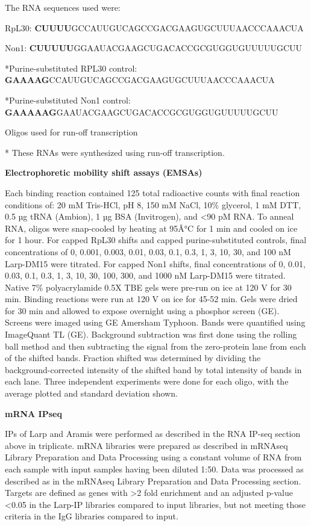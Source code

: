 \documentclass[12pt,oneside]{reedthesis}
\begin{document}
The RNA sequences used were:

RpL30: \textbf{CUUUU}GCCAUUGUCAGCCGACGAAGUGCUUUAACCCAAACUA

Non1: \textbf{CUUUUU}GGAAUACGAAGCUGACACCGCGUGGUGUUUUUGCUU

*Purine-substituted RPL30 control: \textbf{GAAAAG}CCAUUGUCAGCCGACGAAGUGCUUUAACCCAAACUA

*Purine-substituted Non1 control: \textbf{GAAAAAG}GAAUACGAAGCUGACACCGCGUGGUGUUUUUGCUU

Oligos used for run-off transcription

* These RNAs were synthesized using run-off transcription.

\textbf{Electrophoretic mobility shift assays (EMSAs)}

Each binding reaction contained 125 total radioactive counts with final reaction conditions of: 20 mM Tris-HCl, pH 8, 150 mM NaCl, 10\% glycerol, 1 mM DTT, 0.5 µg tRNA (Ambion), 1 µg BSA (Invitrogen), and \textless90 pM RNA. To anneal RNA, oligos were snap-cooled by heating at 95Â°C for 1 min and cooled on ice for 1 hour. For capped RpL30 shifts and capped purine-substituted controls, final concentrations of 0, 0.001, 0.003, 0.01, 0.03, 0.1, 0.3, 1, 3, 10, 30, and 100 nM Larp-DM15 were titrated. For capped Non1 shifts, final concentrations of 0, 0.01, 0.03, 0.1, 0.3, 1, 3, 10, 30, 100, 300, and 1000 nM Larp-DM15 were titrated. Native 7\% polyacrylamide 0.5X TBE gels were pre-run on ice at 120 V for 30 min. Binding reactions were run at 120 V on ice for 45-52 min. Gels were dried for 30 min and allowed to expose overnight using a phosphor screen (GE). Screens were imaged using GE Amersham Typhoon. Bands were quantified using ImageQuant TL (GE). Background subtraction was first done using the rolling ball method and then subtracting the signal from the zero-protein lane from each of the shifted bands. Fraction shifted was determined by dividing the background-corrected intensity of the shifted band by total intensity of bands in each lane. Three independent experiments were done for each oligo, with the average plotted and standard deviation shown.

\textbf{mRNA IPseq}

IPs of Larp and Aramis were performed as described in the RNA IP-seq section above in triplicate. mRNA libraries were prepared as described in mRNAseq Library Preparation and Data Processing using a constant volume of RNA from each sample with input samples having been diluted 1:50. Data was processed as described as in the mRNAseq Library Preparation and Data Processing section. Targets are defined as genes with \textgreater2 fold enrichment and an adjusted p-value \textless0.05 in the Larp-IP libraries compared to input libraries, but not meeting those criteria in the IgG libraries compared to input.
\end{document}
